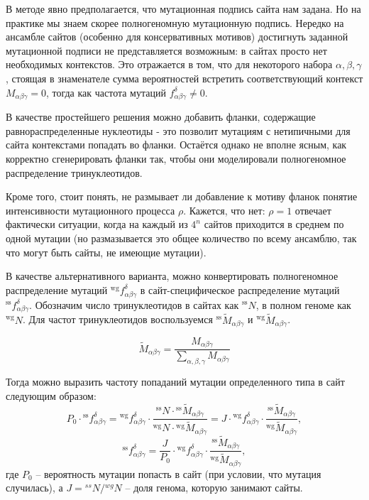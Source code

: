 \documentclass[a4paper]{article}
\begin{document}
В методе явно предполагается, что мутационная подпись сайта нам задана. Но на практике мы знаем скорее полногеномную мутационную подпись. Нередко на ансамбле сайтов (особенно для консервативных мотивов) достигнуть заданной мутационной подписи не представляется возможным: в сайтах просто нет необходимых контекстов. Это отражается в том, что для некоторого набора $\alpha, \beta, \gamma$, стоящая в знаменателе сумма вероятностей встретить соответствующий контекст $M_{\alpha\beta\gamma} = 0$, тогда как частота мутаций $f_{\alpha\beta\gamma}^{\delta}\ne 0$.

В качестве простейшего решения можно добавить фланки, содержащие равнораспределенные нуклеотиды - это позволит мутациям с нетипичными для сайта контекстами попадать во фланки. Остаётся однако не вполне ясным, как корректно сгенерировать фланки так, чтобы они моделировали полногеномное распределение тринуклеотидов.

Кроме того, стоит понять, не размывает ли добавление к мотиву фланок понятие интенсивности мутационного процесса $\rho$. Кажется, что нет: $\rho=1$ отвечает фактически ситуации, когда на каждый из $4^n$ сайтов приходится в среднем по одной мутации (но размазывается это общее количество по всему ансамблю, так что могут быть сайты, не имеющие мутации).

В качестве альтернативного варианта, можно конвертировать полногеномное распределение мутаций ${}^{\textrm{wg}}f_{\alpha\beta\gamma}^{\delta}$ в сайт-специфическое распределение мутаций ${}^{\textrm{ss}}f_{\alpha\beta\gamma}^{\delta}$. Обозначим число тринуклеотидов в сайтах как ${}^{\textrm{ss}}N$, в полном геноме как ${}^{\textrm{wg}}N$. Для частот тринуклеотидов воспользуемся ${}^{\textrm{ss}}\widetilde{M}_{\alpha\beta\gamma}$ и ${}^{\textrm{wg}}\widetilde{M}_{\alpha\beta\gamma}$.

$$\widetilde{M}_{\alpha\beta\gamma} = \frac{M_{\alpha\beta\gamma}}{\sum_{\alpha,\beta,\gamma}M_{\alpha\beta\gamma}}$$

Тогда можно выразить частоту попаданий мутации определенного типа в сайт следующим образом:
$$P_0\cdot{}^{\textrm{ss}}f_{\alpha\beta\gamma}^{\delta} = {}^{\textrm{wg}}f_{\alpha\beta\gamma}^{\delta} \cdot \frac{{}^{\textrm{ss}}N \cdot {}^{\textrm{ss}}\widetilde{M}_{\alpha\beta\gamma}}{{}^{\textrm{wg}}N \cdot {}^{\textrm{wg}}\widetilde{M}_{\alpha\beta\gamma}} = J\cdot{}^{\textrm{wg}}f_{\alpha\beta\gamma}^{\delta} \cdot\frac{{}^{\textrm{ss}}\widetilde{M}_{\alpha\beta\gamma}}{{}^{\textrm{wg}}\widetilde{M}_{\alpha\beta\gamma}},$$
$${}^{\textrm{ss}}f_{\alpha\beta\gamma}^{\delta} = \frac{J}{P_0}\cdot{}^{\textrm{wg}}f_{\alpha\beta\gamma}^{\delta} \cdot\frac{{}^{\textrm{ss}}\widetilde{M}_{\alpha\beta\gamma}}{{}^{\textrm{wg}}\widetilde{M}_{\alpha\beta\gamma}},$$
где $P_0$ -- вероятность мутации попасть в сайт (при условии, что мутация случилась), а $J={}^{ss}N / {}^{wg}N$ -- доля генома, которую занимают сайты.
\end{document}
